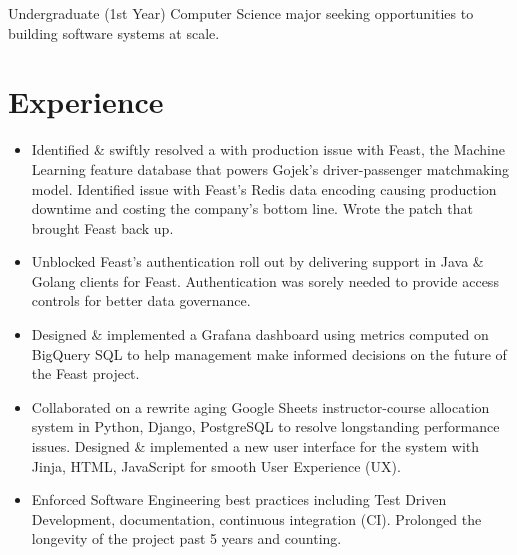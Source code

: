 %
%


\fancyhead{} %


Undergraduate (1st Year) Computer Science major seeking opportunities to building software systems at scale.

\section{Experience}
\begin{itemize}
    \item Identified \& swiftly resolved a with production issue with Feast, the Machine Learning
      feature database that powers Gojek's driver-passenger matchmaking model.
      Identified issue with Feast's Redis data encoding causing production downtime and 
      costing the company's bottom line. Wrote the patch that brought Feast back up.
    \item Unblocked Feast's authentication roll out by delivering
      support in Java \& Golang clients for Feast.
      Authentication was sorely needed to provide access controls for better data governance.
    \item 
        Designed \& implemented a Grafana dashboard using metrics computed on 
        BigQuery SQL to help management make informed decisions 
        on the future of the Feast project.
\end{itemize}

\begin{itemize}
  \item Collaborated on a rewrite aging Google Sheets instructor-course allocation system in Python, Django, PostgreSQL to 
    resolve longstanding performance issues. Designed \& implemented a new user interface 
    for the system with Jinja, HTML, JavaScript for smooth User Experience (UX).
  \item Enforced Software Engineering best practices including Test Driven Development,
    documentation, continuous integration (CI). Prolonged the longevity of the project
    past 5 years and counting.
\end{itemize}

